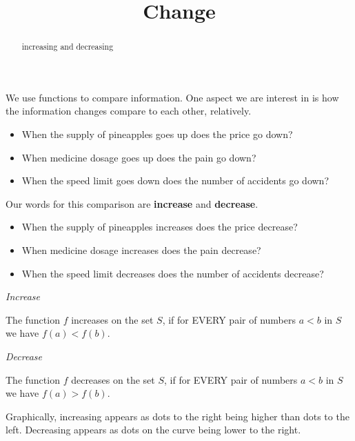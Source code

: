 \documentclass{ximera}
\title{Change}
\begin{document}
\begin{abstract}
increasing and decreasing
\end{abstract}
\maketitle



We use functions to compare information. One aspect we are interest in is how the information changes compare to each other, relatively. 


\begin{itemize}
\item When the supply of pineapples goes up does the price go down?
\item When medicine dosage goes up does the pain go down?
\item When the speed limit goes down does the number of accidents go down?
\end{itemize}


Our words for this comparison are \textbf{increase} and \textbf{decrease}.


\begin{itemize}
\item When the supply of pineapples increases does the price decrease?
\item When medicine dosage increases does the pain decrease?
\item When the speed limit decreases does the number of accidents decrease?
\end{itemize}




\begin{definition} \textit{Increase}

The function $f$ increases on the set $S$, if for EVERY pair of numbers $a < b$ in $S$ we have  $f(a) < f(b)$.


\end{definition}



\begin{definition} \textit{Decrease}

The function $f$ decreases on the set $S$, if for EVERY pair of numbers $a < b$ in $S$ we have  $f(a) > f(b)$.


\end{definition}





Graphically, increasing appears as dots to the right being higher than dots to the left.  Decreasing appears as dots on the curve being lower to the right. 
\end{document}
